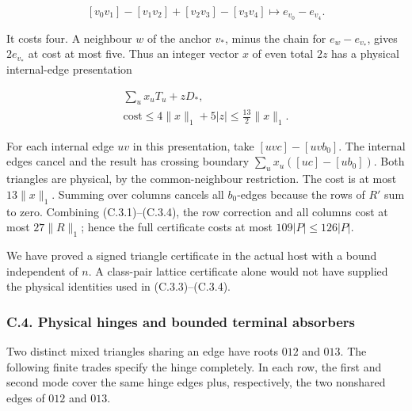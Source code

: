\documentclass[english,11pt,a4paper]{article}
\begin{document}
\[[v_0v_1]-[v_1v_2]+[v_2v_3]-[v_3v_4]
\longmapsto e_{v_0}-e_{v_4}.
\tag{C.3.3}\]

It costs four. A neighbour \(w\) of the anchor \(v_*\), minus the chain for \(e_w-e_{v_*}\), gives \(2e_{v_*}\) at cost at most five. Thus an integer vector \(x\) of even total \(2z\) has a physical internal-edge presentation

\[\begin{gathered}
\sum_u x_u T_u+zD_*,\\
\text{cost}\le4\|x\|_1+5|z|\le\tfrac{13}{2}\|x\|_1.
\end{gathered}
\tag{C.3.4}\]

For each internal edge \(uv\) in this presentation, take \([uvc]-[uvb_0]\). The internal edges cancel and the result has crossing boundary \(\sum_u x_u([uc]-[ub_0])\). Both triangles are physical, by the common-neighbour restriction. The cost is at most \(13\|x\|_1\). Summing over columns cancels all \(b_0\)-edges because the rows of \(R'\) sum to zero. Combining (C.3.1)--(C.3.4), the row correction and all columns cost at most \(27\|R\|_1\); hence the full certificate costs at most \(109|P|\le126|P|\).

We have proved a signed triangle certificate in the actual host with a bound independent of \(n\). A class-pair lattice certificate alone would not have supplied the physical identities used in (C.3.3)--(C.3.4).

\subsubsection{C.4. Physical hinges and bounded terminal absorbers}\label{c.4.-physical-hinges-and-bounded-terminal-absorbers}

Two distinct mixed triangles sharing an edge have roots \(012\) and \(013\). The following finite trades specify the hinge completely. In each row, the first and second mode cover the same hinge edges plus, respectively, the two nonshared edges of \(012\) and \(013\).
\end{document}
